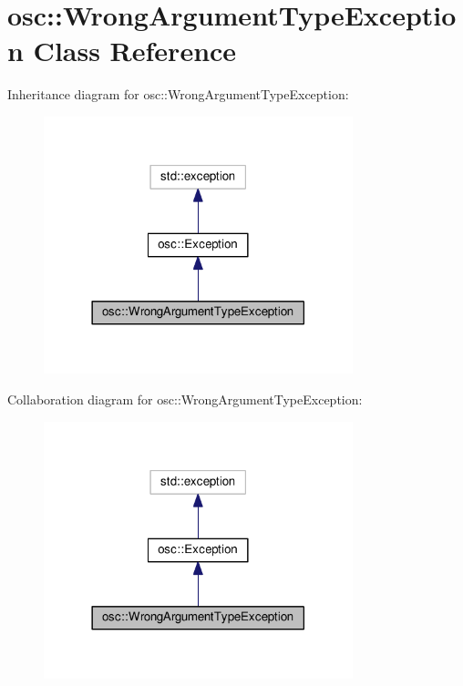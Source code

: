 \hypertarget{classosc_1_1_wrong_argument_type_exception}{}\section{osc\+:\+:Wrong\+Argument\+Type\+Exception Class Reference}
\label{classosc_1_1_wrong_argument_type_exception}


Inheritance diagram for osc\+:\+:Wrong\+Argument\+Type\+Exception\+:\nopagebreak
\begin{figure}[H]
\begin{center}
\leavevmode
\includegraphics[width=254pt]{classosc_1_1_wrong_argument_type_exception__inherit__graph}
\end{center}
\end{figure}


Collaboration diagram for osc\+:\+:Wrong\+Argument\+Type\+Exception\+:\nopagebreak
\begin{figure}[H]
\begin{center}
\leavevmode
\includegraphics[width=254pt]{classosc_1_1_wrong_argument_type_exception__coll__graph}
\end{center}
\end{figure}
